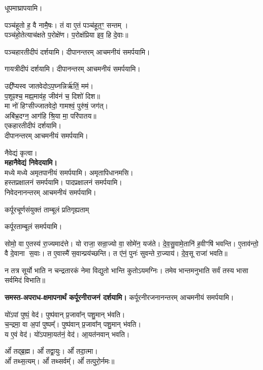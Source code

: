 \begin{center}
धूपमाघ्रापयामि।\medskip

पञ्च॑हूतो ह॒ वै नामै॒षः। तं वा ए॒तं पञ्च॑हूत॒ꣳ॒ सन्तम्।\\
पञ्च॑हो॒तेत्याच॑क्षते प॒रोक्षे॑ण। प॒रोक्ष॑प्रिया इव॒ हि दे॒वाः॥

पञ्चहारतीदीपं दर्शयामि। दीपानन्तरम् आचमनीयं समर्पयामि।\medskip

गायत्रीदीपं दर्शयामि। दीपानन्तरम् आचमनीयं समर्पयामि।\medskip

उद्दी᳚प्यस्व जातवेदोऽप॒घ्नन्निर्ऋ॑तिं॒ मम॑।\\
प॒शूꣴश्च॒ मह्य॒माव॑ह॒ जीव॑नं च॒ दिशो॑ दिश॥\\
मा नो॑ हिꣳसीज्जातवेदो॒ गामश्वं॒ पुरु॑षं॒ जग॑त्।\\
अबि॑भ्र॒दग्न॒ आग॑हि श्रि॒या मा॒ परि॑पातय॥\\
एकहारतीदीपं दर्शयामि।\\
दीपानन्तरम् आचमनीयं समर्पयामि।\medskip

नैवेद्यं कृत्वा।\\
\textbf{\swamine{} \blank{} महानैवेद्यं निवेदयामि।}\\
मध्ये मध्ये अमृतपानीयं समर्पयामि। अमृतापिधानमसि।\\
हस्तप्रक्षालनं समर्पयामि। पादप्रक्षालनं समर्पयामि।\\
निवेदनानन्तरम् आचमनीयं समर्पयामि।\medskip

{कर्पूरचूर्णसंयुक्तं ताम्बूलं प्रतिगृह्यताम्}

कर्पूरताम्बूलं समर्पयामि।\medskip

सोमो॒ वा ए॒तस्य॑ रा॒ज्यमाद॑त्ते।
यो राजा॒ सन्रा॒ज्यो वा॒ सोमे॑न॒ यज॑ते।
दे॒व॒सु॒वामे॒तानि॑ ह॒वीꣳषि॑ भवन्ति।
ए॒ताव॑न्तो॒ वै दे॒वाना स॒वाः।
त ए॒वास्मै॑ स॒वान्प्रय॑च्छन्ति।
त ए॑नं॒ पुनः॑ सुवन्ते रा॒ज्याय॑।
दे॒व॒सू राजा॑ भवति॥

न तत्र सूर्यो भाति न चन्द्रतारकं नेमा विद्युतो भान्ति कुतोऽयमग्निः।
तमेव भान्तमनुभाति सर्वं तस्य भासा सर्वमिदं विभाति॥

\textbf{\swamine{} समस्त-अपराध-क्षमापनार्थं कर्पूरनीराजनं दर्शयामि।} कर्पूरनीरजनानन्तरम् आचमनीयं समर्पयामि।\medskip

यो॑ऽपां पुष्पं॒ वेद॑। पुष्प॑वान् प्र॒जावा᳚न् पशु॒मान् भ॑वति।\\
च॒न्द्रमा॒ वा अ॒पां पुष्पम्᳚। पुष्प॑वान् प्र॒जावा᳚न् पशु॒मान् भ॑वति।\\
य ए॒वं वेद॑। यो॑ऽपामा॒यत॑नं॒ वेद॑। आ॒यत॑नवान् भवति।\medskip

ओं᳚ तद्ब्र॒ह्म। ओं᳚ तद्वा॒युः। ओं᳚ तदा॒त्मा।\\ ओं᳚ तथ्स॒त्यम्‌।
ओं᳚ तथ्सर्वम्᳚‌। ओं᳚ तत्पुरो॒र्नमः॥\medskip


\end{center}
